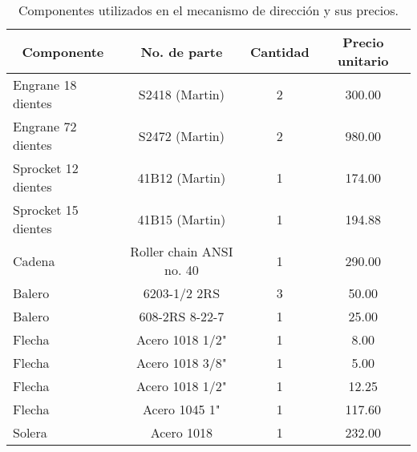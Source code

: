 \begin{table}[h]
\centering
\begin{tabular}{@{}lccc@{}}
\toprule
\multicolumn{1}{c}{\textbf{Componente}} & \textbf{No. de parte}    & \textbf{Cantidad} & \textbf{Precio unitario} \\ \midrule
Engrane 18 dientes                      & S2418 (Martin)           & 2                 & 300.00                   \\
Engrane 72 dientes                      & S2472 (Martin)           & 2                 & 980.00                   \\
Sprocket 12 dientes                     & 41B12 (Martin)           & 1                 & 174.00                   \\
Sprocket 15 dientes                     & 41B15 (Martin)           & 1                 & 194.88                   \\
Cadena                                  & Roller chain ANSI no. 40 & 1                 & 290.00                   \\
Balero                                  & 6203-1/2 2RS             & 3                 & 50.00                    \\
Balero                                  & 608-2RS 8-22-7           & 1                 & 25.00                    \\
Flecha                                  & Acero 1018 1/2"          & 1                 & 8.00                     \\
Flecha                                  & Acero 1018 3/8"          & 1                 & 5.00                     \\
Flecha                                  & Acero 1018 1/2"          & 1                 & 12.25                    \\
Flecha                                  & Acero 1045 1"            & 1                 & 117.60                   \\
Solera                                  & Acero 1018               & 1                 & 232.00                   \\ \bottomrule
\end{tabular}
\caption{Componentes utilizados en el mecanismo de dirección y sus precios.}
\label{tab:componentes_mecanicos}
\end{table}
